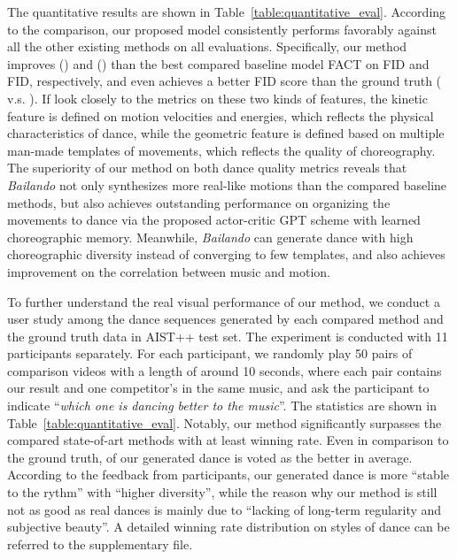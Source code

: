 The quantitative results are shown in Table~\ref{table:quantitative_eval}.
According to the comparison, our proposed model consistently performs favorably against all the other existing methods on all evaluations.
Specifically, our method improves  () and  () than the best compared baseline model FACT on FID and FID, respectively, and even achieves a better FID score than the ground truth ( v.s. ).
If look closely to the metrics on these two kinds of features, the kinetic feature is defined on motion velocities and energies, which reflects the physical characteristics of dance, while the geometric feature is defined based on multiple man-made templates of movements, which reflects the quality of choreography.
The superiority of our method on both dance quality metrics reveals that {{\textit{Bailando}}} not only synthesizes more real-like motions than the compared baseline methods, but also achieves outstanding performance on organizing the movements to dance via the proposed  actor-critic GPT  scheme with learned choreographic memory.
Meanwhile, {{\textit{Bailando}}} can generate dance with high choreographic diversity instead of converging to few templates, and also achieves improvement on the correlation between music and motion.



To further understand the real visual performance of our method, we conduct a user study among the dance sequences generated by each compared method and the ground truth data in AIST++ test set.
The experiment is conducted with 11 participants separately.
For each participant, we randomly play 50 pairs of  comparison videos with a length of around 10 seconds, where each pair contains our result and one competitor's in the same music, and ask the participant to indicate ``\textit{which one is dancing better to the music}''.
The statistics are shown in Table~\ref{table:quantitative_eval}.
Notably, our method significantly surpasses the compared state-of-art methods with at least  winning rate.
Even in comparison to the ground truth,  of our generated dance is voted as the better in average.
According to the feedback from participants, our generated dance is more ``stable to the rythm'' with ``higher diversity'', while the reason why our method is still not as good as real dances is mainly due to ``lacking of long-term regularity  and subjective beauty''.
A detailed winning rate distribution on styles of dance can be referred to the supplementary file.








